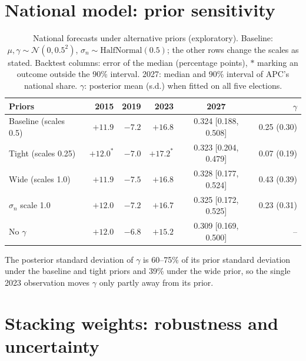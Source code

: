 \documentclass[preprint,12pt,authoryear]{elsarticle}
\begin{document}
\section{National model: prior sensitivity}
\label{app:national}

\begin{table}[ht]
\centering
\caption{National forecasts under alternative priors (exploratory). Baseline: $\mu,\gamma \sim \mathcal{N}(0,0.5^2)$, $\sigma_n \sim \text{HalfNormal}(0.5)$; the other rows change the scales as stated. Backtest columns: error of the median (percentage points), $\ast$ marking an outcome outside the 90\% interval. 2027: median and 90\% interval of APC's national share. $\gamma$: posterior mean (s.d.) when fitted on all five elections.}
\label{tab:prior_sens}
\small
\setlength{\tabcolsep}{4pt}
\begin{tabular}{lrrrcr}
\toprule
Priors & 2015 & 2019 & 2023 & 2027 & $\gamma$ \\
\midrule
Baseline (scales 0.5) & $+11.9$ & $-7.2$ & $+16.8$ & 0.324 [0.188, 0.508] & 0.25 (0.30) \\
Tight (scales 0.25) & $+12.0^\ast$ & $-7.0$ & $+17.2^\ast$ & 0.323 [0.204, 0.479] & 0.07 (0.19) \\
Wide (scales 1.0) & $+11.9$ & $-7.5$ & $+16.8$ & 0.328 [0.177, 0.524] & 0.43 (0.39) \\
$\sigma_n$ scale 1.0 & $+12.0$ & $-7.2$ & $+16.7$ & 0.325 [0.172, 0.525] & 0.23 (0.31) \\
No $\gamma$ & $+12.0$ & $-6.8$ & $+15.2$ & 0.309 [0.169, 0.500] & -- \\
\bottomrule
\end{tabular}
\end{table}

The posterior standard deviation of $\gamma$ is 60--75\% of its prior standard deviation under the baseline and tight priors and 39\% under the wide prior, so the single 2023 observation moves $\gamma$ only partly away from its prior.

\section{Stacking weights: robustness and uncertainty}
\label{app:weights}
\end{document}
